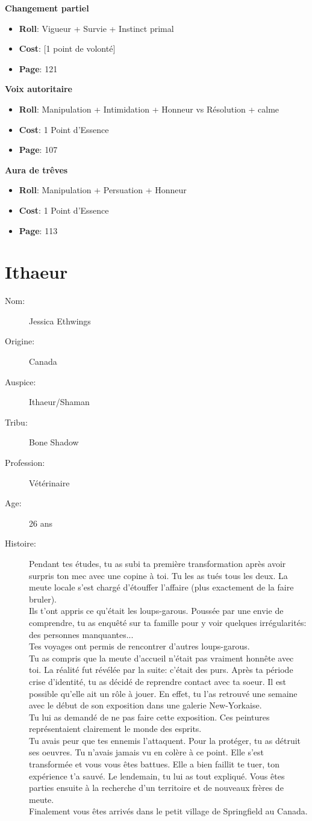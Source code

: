 \documentclass[oneside,12pt]{book}
\newcommand\don[5]{
\textbf{#1} \\
#2
\begin{itemize}
\item{ \textbf{Roll}: #3}
\item{ \textbf{Cost}: #4}
\item{ \textbf{Page}: #5}
\end{itemize}
\vspace{0.5cm}
}
\begin{document}
\begin{flushleft}
\don{Changement partiel}{}{Vigueur + Survie + Instinct primal}{[1 point de volonté]}{121}
\don{Voix autoritaire}{}{ Manipulation + Intimidation + Honneur vs Résolution + calme}{1 Point d'Essence}{107}
\don{Aura de trêves}{}{Manipulation + Persuation + Honneur}{1 Point d'Essence}{113}


\clearpage
\section{Ithaeur}
\begin{description}
\item[Nom:]{Jessica Ethwings}
\item[Origine:]{Canada}
\item[Auspice:]{Ithaeur/Shaman}
\item[Tribu:]{Bone Shadow}
\item[Profession:]{Vétérinaire}
\item[Age:]{26 ans}
\item[Histoire:]{ 
Pendant tes études, tu as subi ta première transformation après avoir surpris ton mec avec une copine à toi. Tu les as tués tous les deux.
La meute locale s'est chargé d'étouffer l'affaire (plus exactement de la faire bruler).\\
Ils t'ont appris ce qu'était les loups-garous. Poussée par une envie de comprendre, tu as enquêté sur ta famille pour y voir quelques irrégularités: des personnes manquantes...\\
Tes voyages ont permis de rencontrer d'autres loups-garous.\\
Tu as compris que la meute d'accueil n'était pas vraiment honnête avec toi. La réalité fut révélée par la suite: c'était des purs.
Après ta période crise d'identité, tu as décidé de reprendre contact avec ta soeur. Il est possible qu'elle ait un rôle à jouer.
En effet, tu l'as retrouvé une semaine avec le début de son exposition dans une galerie New-Yorkaise.\\
Tu lui as demandé de ne pas faire cette exposition. Ces peintures représentaient clairement le monde des esprits.\\
Tu avais peur que tes ennemis l'attaquent. Pour la protéger, tu as détruit ses oeuvres. Tu n'avais jamais vu en colère à ce point.
Elle s'est transformée et vous vous êtes battues. Elle a bien faillit te tuer, ton expérience t'a sauvé. Le lendemain, tu lui as tout expliqué.
Vous êtes parties ensuite à la recherche d'un territoire et de nouveaux frères de meute.\\
Finalement vous êtes arrivés dans le petit village de Springfield au Canada.  \\
}
\end{description}
\end{flushleft}
\end{document}
